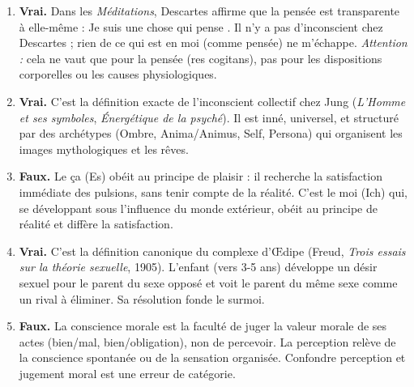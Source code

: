 \documentclass[11pt]{article}
\newcommand{\cle}[1]{{\popxbold\color{popdark}#1}}
\begin{document}
\begin{corrige}
\begin{enumerate}
\item \textbf{Vrai.} Dans les \emph{Méditations}, Descartes affirme que la pensée est transparente à elle-même : \guillemotleft Je suis une chose qui pense \guillemotright. Il n'y a pas d'inconscient chez Descartes ; rien de ce qui est en moi (comme pensée) ne m'échappe. \textit{Attention :} cela ne vaut que pour la pensée (res cogitans), pas pour les dispositions corporelles ou les causes physiologiques.
\item \textbf{Vrai.} C'est la définition exacte de l'\cle{inconscient collectif} chez Jung (\emph{L'Homme et ses symboles}, \emph{Énergétique de la psyché}). Il est inné, universel, et structuré par des \cle{archétypes} (Ombre, Anima/Animus, Self, Persona) qui organisent les images mythologiques et les rêves.
\item \textbf{Faux.} Le \cle{ça} (Es) obéit au \cle{principe de plaisir} : il recherche la satisfaction immédiate des pulsions, sans tenir compte de la réalité. C'est le \cle{moi} (Ich) qui, se développant sous l'influence du monde extérieur, obéit au \cle{principe de réalité} et diffère la satisfaction.
\item \textbf{Vrai.} C'est la définition canonique du \cle{complexe d'Œdipe} (Freud, \emph{Trois essais sur la théorie sexuelle}, 1905). L'enfant (vers 3-5 ans) développe un désir sexuel pour le parent du sexe opposé et voit le parent du même sexe comme un rival à éliminer. Sa résolution fonde le surmoi.
\item \textbf{Faux.} La \cle{conscience morale} est la faculté de \cle{juger} la valeur morale de ses actes (bien/mal, bien/obligation), non de percevoir. La perception relève de la \cle{conscience spontanée} ou de la \cle{sensation} organisée. Confondre perception et jugement moral est une erreur de catégorie.
\end{enumerate}
\end{corrige}
\end{document}
